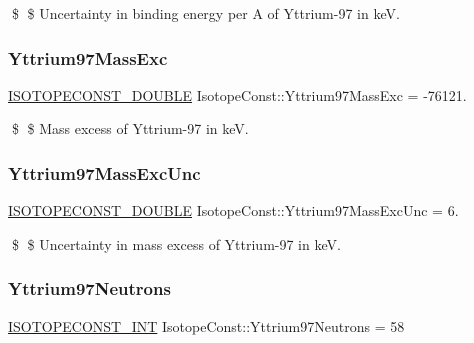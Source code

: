 \$ \$ Uncertainty in binding energy per A of Yttrium-\/97 in keV. \mbox{\label{group___isotope_const-_yttrium-_y97_ga45e382c75d9caaa1ed996a1f783e70ad}} 
\subsubsection{\texorpdfstring{Yttrium97\+Mass\+Exc}{Yttrium97MassExc}}
{\footnotesize\ttfamily \mbox{\hyperlink{group___isotope_const-_macros_ga8f45a7272ce02c0b4c65c44636ed719a}{I\+S\+O\+T\+O\+P\+E\+C\+O\+N\+S\+T\+\_\+\+D\+O\+U\+B\+LE}} Isotope\+Const\+::\+Yttrium97\+Mass\+Exc = -\/76121.}

\$ \$ Mass excess of Yttrium-\/97 in keV. \mbox{\label{group___isotope_const-_yttrium-_y97_gabd1a47ac7f004852674e54f22a1ecd3e}} 
\subsubsection{\texorpdfstring{Yttrium97\+Mass\+Exc\+Unc}{Yttrium97MassExcUnc}}
{\footnotesize\ttfamily \mbox{\hyperlink{group___isotope_const-_macros_ga8f45a7272ce02c0b4c65c44636ed719a}{I\+S\+O\+T\+O\+P\+E\+C\+O\+N\+S\+T\+\_\+\+D\+O\+U\+B\+LE}} Isotope\+Const\+::\+Yttrium97\+Mass\+Exc\+Unc = 6.}

\$ \$ Uncertainty in mass excess of Yttrium-\/97 in keV. \mbox{\label{group___isotope_const-_yttrium-_y97_ga536020c2a4a422495e4e932c0f5d162e}} 
\subsubsection{\texorpdfstring{Yttrium97\+Neutrons}{Yttrium97Neutrons}}
{\footnotesize\ttfamily \mbox{\hyperlink{group___isotope_const-_macros_ga5f18360b3e99483a35c32d789e62621c}{I\+S\+O\+T\+O\+P\+E\+C\+O\+N\+S\+T\+\_\+\+I\+NT}} Isotope\+Const\+::\+Yttrium97\+Neutrons = 58}

